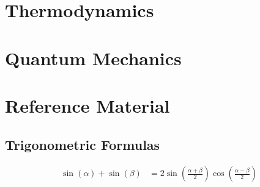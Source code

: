 \documentclass[10pt,letterpaper,final,twoside,notitlepage]{article}
\begin{document}
\section*{Thermodynamics} \label{sec:Thermo}
\section*{Quantum Mechanics} \label{sec:Quantum Mech}
\section*{Reference Material} \label{sec:Reference Material}
	\subsection*{Trigonometric Formulas} \label{subsec:Trig Formulas}
	\begin{align}
		\sin \left( \alpha \right) + \sin \left( \beta \right) &= 2 \sin \left( \frac{\alpha + \beta}{2} \right) \cos\left( \frac{\alpha - \beta}{2} \right) 
\end{align}
\end{document}
